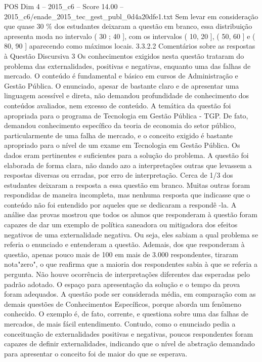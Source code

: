 \begin{textsample}{POS Dim 4 – 2015\_c6 – Score 14.00 – 2015\_c6/enade\_2015\_tec\_gest\_publ\_0d4a20dfe1.txt}
Sem levar em consideração que quase 30 \% dos estudantes deixaram a questão em branco, essa distribuição apresenta moda no intervalo ( 30 ; 40 ], com os intervalos ( 10, 20 ], ( 50, 60 ] e ( 80, 90 ] aparecendo como máximos locais. 3.3.2.2 Comentários sobre as respostas à Questão Discursiva 3 Os conhecimentos exigidos nesta questão trataram do problema das externalidades, positivas e negativas, enquanto uma das falhas de mercado.
O conteúdo é fundamental e básico em cursos de Administração e Gestão Pública.
O enunciado, apesar de bastante claro e de apresentar uma linguagem acessível e direta, não demandou profundidade de conhecimento dos conteúdos avaliados, nem excesso de conteúdo.
A temática da questão foi apropriada para o programa de Tecnologia em Gestão Pública - TGP.
De fato, demandou conhecimento específico da teoria de economia do setor público, particularmente de uma falha de mercado, e o conceito exigido é bastante apropriado para o nível de um exame em Tecnologia em Gestão Pública.
Os dados eram pertinentes e suficientes para a solução do problema.
A questão foi elaborada de forma clara, não dando azo a interpretações outras que levassem a respostas diversas ou erradas, por erro de interpretação.
Cerca de 1/3 dos estudantes deixaram a resposta a essa questão em branco.
Muitas outras foram respondidas de maneira incompleta, mas nenhuma resposta que indicasse que o conteúdo não foi entendido por aqueles que se dedicaram a respondê -la.
A análise das provas mostrou que todos os alunos que responderam à questão foram capazes de dar um exemplo de política saneadora ou mitigadora dos efeitos negativos de uma externalidade negativa.
Ou seja, eles sabiam a qual problema se referia o enunciado e entenderam a questão.
Ademais, dos que responderam à questão, apenas pouco mais de 100 em mais de 3.000 respondentes, tiraram nota"zero", o que reafirma que a maioria dos respondentes sabia à que se referia a pergunta.
Não houve ocorrência de interpretações diferentes das esperadas pelo padrão adotado.
O espaço para apresentação da solução e o tempo da prova foram adequados.
A questão pode ser considerada média, em comparação com as demais questões de Conhecimentos Específicos, porque aborda um fenômeno conhecido.
O exemplo é, de fato, corrente, e questiona sobre uma das falhas de mercados, de mais fácil entendimento.
Contudo, como o enunciado pedia a conceituação de externalidades positivas e negativas, poucos respondentes foram capazes de definir externalidades, indicando que o nível de abstração demandado para apresentar o conceito foi de maior do que se esperava.

\end{textsample}
